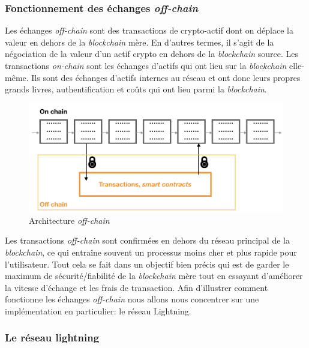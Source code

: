 \subsubsection{Fonctionnement des échanges \textit{off-chain}}
Les échanges \textit{off-chain} sont des transactions de crypto-actif dont on déplace la valeur en dehors de la \textit{blockchain} mère. En d’autres termes, il s’agit de la négociation de la valeur d’un actif crypto en dehors de la \textit{blockchain} source. Les transactions \textit{on-chain} sont les échanges d'actifs qui ont lieu sur la \textit{blockchain} elle-même.
Ils sont des échanges d’actifs internes au réseau et ont donc leurs propres grands livres, authentification et coûts qui ont lieu parmi la \textit{blockchain}.
\begin{figure}[h!]
    \centering
    \includegraphics[scale=0.3]{decentralisation/offchain.png}
    \caption{Architecture \textit{off-chain}}
    \label{fig:offchain}
\end{figure}
Les transactions \textit{off-chain} sont confirmées en dehors du réseau principal de la \textit{blockchain}, ce qui entraîne souvent un processus moins cher et plus rapide pour l’utilisateur. 
Tout cela se fait dans un objectif bien précis qui est de garder le maximum de sécurité/fiabilité de la \textit{blockchain} mère tout en essayant d'améliorer la vitesse d'échange et les frais de transaction.
Afin d'illustrer comment fonctionne les échanges \textit{off-chain} nous allons nous concentrer sur une implémentation en particulier: le réseau Lightning. 

\subsubsection{Le réseau lightning}

